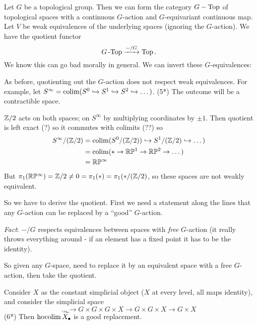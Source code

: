 \documentclass[../MH_Total.tex]{subfiles}
\begin{document}
\begin{example}
	Let $G$ be a topological group. Then we can form the category $G-\operatorname{Top}$ of topological spaces with a continuous $G$-action and $G$-equivariant continuous map. Let $V$ be weak equivalences of the underlying spaces (ignoring the $G$-action). We have the quotient functor
	\[
	G\operatorname{-Top} \xrightarrow{-/G} \operatorname{Top}.
	\]
	We know this can go bad morally in general. We can invert these $G$-equivalences:
	\begin{center}
	\end{center}
	As before, quotienting out the $G$-action does not respect weak equivalences. For example, let $S^\infty = \operatorname{colim}(S^0 \hookrightarrow S^1 \hookrightarrow S^2 \hookrightarrow \dots)$. (5*) The outcome will be a contractible space.

	$\mathbb{Z}/2$ acts on both spaces; on $S^\infty$ by multiplying coordinates by $\pm 1$. Then quotient is left exact (?) so it commutes with colimits (??) so
	\begin{align*}
	S^\infty/(\mathbb{Z}/2) &= \operatorname{colim}(S^0/(\mathbb{Z}/2)) \hookrightarrow S^1/(\mathbb{Z}/2) \hookrightarrow \dots)\\
	&= \operatorname{colim}(* \to \mathbb{R}\mathbb{P}^1 \to \mathbb{R}\mathbb{P}^2 \to \dots)\\
	&= \mathbb{R}\mathbb{P}^\infty
	\end{align*}
	But $\pi_1(\mathbb{R}\mathbb{P}^\infty) = \mathbb{Z}/2 \ne 0 = \pi_1(*) = \pi_1(*/(\mathbb{Z}/2)$, so these spaces are not weakly equivalent.

	So we have to derive the quotient. First we need a statement along the lines that any $G$-action can be replaced by a ``good'' $G$-action.

	\emph{Fact}: $-/G$ respects equivalences between spaces with \emph{free} $G$-action (it really throws everything around - if an element has a fixed point it has to be the identity). 

	So given any $G$-space, need to replace it by an equivalent space with a free $G$-action, then take the quotient.

	Consider $X$ as the constant simplicial object ($X$ at every level, all maps identity), and consider the simplicial space
	\[
	\dots \to G \times G \times G \times X \to G \times G \times X \to G \times X 
	\]
	(6*) Then $\operatorname{hocolim}\widetilde{X_\bullet}$ is a good replacement. 
\end{example}
\end{document}
